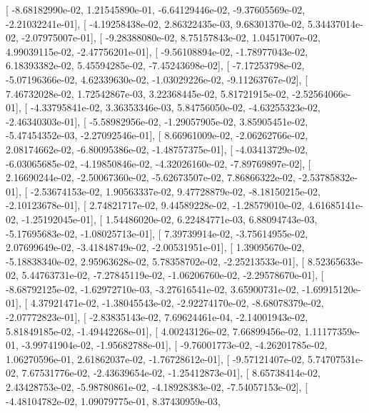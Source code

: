 \documentclass{article}
\begin{document}
       [ -8.68182990e-02,   1.21545890e-01,  -6.64129446e-02,
         -9.37605569e-02,  -2.21032241e-01],
       [ -4.19258438e-02,   2.86322435e-03,   9.68301370e-02,
          5.34437014e-02,  -2.07975007e-01],
       [ -9.28388080e-02,   8.75157843e-02,   1.04517007e-02,
          4.99039115e-02,  -2.47756201e-01],
       [ -9.56108894e-02,  -1.78977043e-02,   6.18393382e-02,
          5.45594285e-02,  -7.45243698e-02],
       [ -7.17253798e-02,  -5.07196366e-02,   4.62339630e-02,
         -1.03029226e-02,  -9.11263767e-02],
       [  7.46732028e-02,   1.72542867e-03,   3.22368445e-02,
          5.81721915e-02,  -2.52564066e-01],
       [ -4.33795841e-02,   3.36353346e-03,   5.84756050e-02,
         -4.63255323e-02,  -2.46340303e-01],
       [ -5.58982956e-02,  -1.29057905e-02,   3.85905451e-02,
         -5.47454352e-03,  -2.27092546e-01],
       [  8.66961009e-02,  -2.06262766e-02,   2.08174662e-02,
         -6.80095386e-02,  -1.48757375e-01],
       [ -4.03413729e-02,  -6.03065685e-02,  -4.19850846e-02,
         -4.32026160e-02,  -7.89769897e-02],
       [  2.16690244e-02,  -2.50067360e-02,  -5.62673507e-02,
          7.86866322e-02,  -2.53785832e-01],
       [ -2.53674153e-02,   1.90563337e-02,   9.47728879e-02,
         -8.18150215e-02,  -2.10123678e-01],
       [  2.74821717e-02,   9.44589228e-02,  -1.28579010e-02,
          4.61685141e-02,  -1.25192045e-01],
       [  1.54486020e-02,   6.22484771e-03,   6.88094743e-03,
         -5.17695683e-02,  -1.08025713e-01],
       [  7.39739914e-02,  -3.75614955e-02,   2.07699649e-02,
         -3.41848749e-02,  -2.00531951e-01],
       [  1.39095670e-02,  -5.18838340e-02,   2.95963628e-02,
          5.78358702e-02,  -2.25213533e-01],
       [  8.52365633e-02,   5.44763731e-02,  -7.27845119e-02,
         -1.06206760e-02,  -2.29578670e-01],
       [ -8.68792125e-02,  -1.62972710e-03,  -3.27616541e-02,
          3.65900731e-02,  -1.69915120e-01],
       [  4.37921471e-02,  -1.38045543e-02,  -2.92274170e-02,
         -8.68078379e-02,  -2.07772823e-01],
       [ -2.83835143e-02,   7.69624461e-04,  -2.14001943e-02,
          5.81849185e-02,  -1.49442268e-01],
       [  4.00243126e-02,   7.66899456e-02,   1.11177359e-01,
         -3.99741904e-02,  -1.95682788e-01],
       [ -9.76001773e-02,  -4.26201785e-02,   1.06270596e-01,
          2.61862037e-02,  -1.76728612e-01],
       [ -9.57121407e-02,   5.74707531e-02,   7.67531776e-02,
         -2.43639654e-02,  -1.25412873e-01],
       [  8.65738414e-02,   2.43428753e-02,  -5.98780861e-02,
         -4.18928383e-02,  -7.54057153e-02],
       [ -4.48104782e-02,   1.09079775e-01,   8.37430959e-03,
\end{document}
